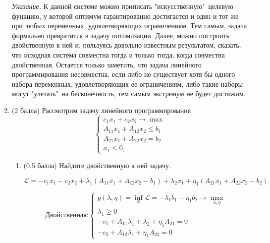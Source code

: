 \documentclass[a5paper,twoside,russian]{article}
\begin{document}
\begin{enumerate}[label=\textbf{Задача \arabic*.}]
        \textit{Указание.} К данной системе можно приписать "искусственную"\ целевую функцию, у которой оптимум гарантированно достигается и один и тот же при любых переменных, удовлетворяющих ограничениям. Тем самым, задача формально превратится в задачу оптимизации. Далее, можно построить двойственную к ней и, пользуясь довольно известным результатом, сказать, что исходная система совместна тогда и только тогда, когда совместна двойственная. Остается только заметить, что задача линейного программирования несовместна, если либо не существует хотя бы одного набора переменных, удовлетворяющих ее ограничениям, либо такие наборы могут "улетать"\ на бесконечность, тем самым экстремум не будет достижим.

        \item (2 балла) Рассмотрим задачу линейного программирования
        \begin{equation}
            \begin{cases}
                c_1x_1 + c_2x_2 \rightarrow \max \\
                A_{11}x_1 + A_{12}x_2 \leq b_1 \\
                A_{21}x_1 + A_{22}x_2 = b_2 \\
                x_1 \leq 0,
                \label{eq:linprog_classic}
            \end{cases}
        \end{equation}

        \begin{enumerate}
            \item (0.5 балла) Найдите двойственную к ней задачу.
            \begin{prf}
                $\mathcal{L} = -c_1 x_1 - c_2 x_2 + \lambda_1 (A_{11} x_1 + A_{12}x_2 - b_1) + \lambda_2 x_1 + \eta_1 (A_{21} x_1 + A_{22}x_2 - b_2)$

                \[
                    \text{Двойственная:}
                    \left\{\!
                    \begin{array}{l}
                        g(\lambda, \eta) = \inf\limits_{x} \mathcal{L} = - \lambda_1 b_1 - \eta_1 b_2  \rightarrow \max\limits_{\lambda, \eta}\\
                        \lambda_1 \geq 0                                                                                                     \\
                        -c_1 + A_{11} \lambda_1 + \lambda_2 + \eta_1 A_{21} = 0                                                              \\
                        -c_2 + A_{12}\lambda_1 + \eta_1 A_{22} = 0
                    \end{array}
                    \right.
                \]
            \end{prf}


\end{enumerate}
\end{enumerate}
\end{document}
